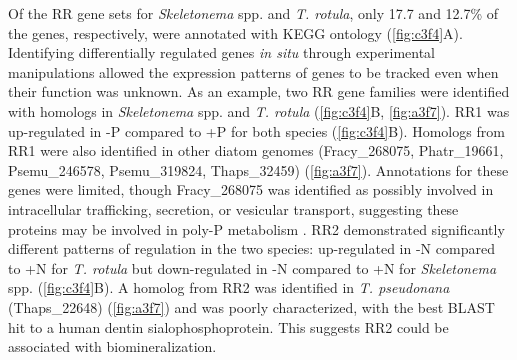 Of the RR gene sets for \textit{Skeletonema} spp. and \textit{T. rotula}, only 17.7 and 12.7\% of the genes, respectively, were annotated with KEGG ontology (\cref{fig:c3f4}A). Identifying differentially regulated genes \textit{in situ} through experimental manipulations allowed the expression patterns of genes to be tracked even when their function was unknown. As an example, two RR gene families were identified with homologs in \textit{Skeletonema} spp. and \textit{T. rotula} (\cref{fig:c3f4}B, \cref{fig:a3f7}). RR1 was up-regulated in -P compared to +P for both species (\cref{fig:c3f4}B). Homologs from RR1 were also identified in other diatom genomes (Fracy\_268075, Phatr\_19661, Psemu\_246578, Psemu\_319824, Thaps\_32459) (\cref{fig:a3f7}). Annotations for these genes were limited, though Fracy\_268075 was identified as possibly involved in intracellular trafficking, secretion, or vesicular transport, suggesting these proteins may be involved in poly-P metabolism \citep{Ogawa2000}. RR2 demonstrated significantly different patterns of regulation in the two species: up-regulated in -N compared to +N for \textit{T. rotula} but down-regulated in -N compared to +N for \textit{Skeletonema} spp. (\cref{fig:c3f4}B). A homolog from RR2 was identified in \textit{T. pseudonana} (Thaps\_22648) (\cref{fig:a3f7}) and was poorly characterized, with the best BLAST hit to a human dentin sialophosphoprotein. This suggests RR2 could be associated with biomineralization.\par

